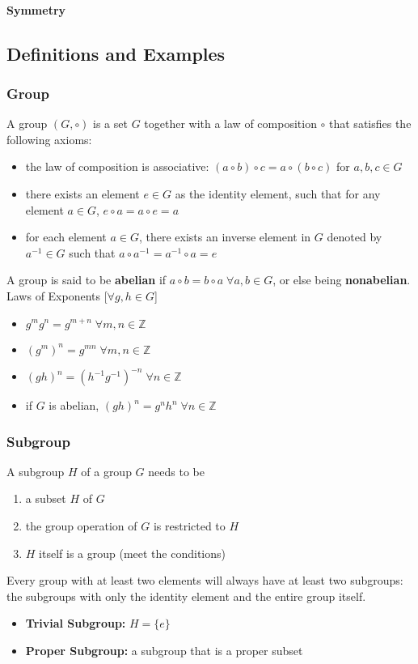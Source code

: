 \documentclass{article}
\begin{document}
\paragraph{Symmetry}
\subsection{Definitions and Examples}
\subsubsection{Group}
A group $(G,\circ)$ is a set $G$ together with a law of composition $\circ$ that satisfies the following axioms:
\begin{itemize}
    \item the law of composition is associative: 
    $(a\circ b)\circ c=a\circ (b\circ c)$ for $a,b,c\in G$
    \item there exists an element $e\in G$ as the identity element, such that for any element $a\in G$, $e\circ a=a\circ e=a$
    \item for each element $a\in G$, there exists an inverse element in $G$ denoted by $a^{-1}\in G$ such that $a\circ a^{-1}=a^{-1}\circ a=e$
\end{itemize}
A group is said to be \textbf{abelian} if $a\circ b=b\circ a \;\forall a,b\in G$, or else being \textbf{nonabelian}.
\\Laws of Exponents [$\forall g,h\in G$]\\
\begin{itemize}
    \item $g^{m}g^{n}=g^{m+n}\;\forall m,n\in \mathbb{Z}$
    \item $(g^m)^n=g^{mn}\;\forall m,n\in \mathbb{Z}$
    \item $(gh)^n=(h^{-1}g^{-1})^{-n}\;\forall n\in \mathbb{Z}$
    \item if $G$ is abelian, $(gh)^n=g^{n}h^{n}\;\forall n\in\mathbb{Z}$
\end{itemize}
\subsubsection{Subgroup}
A subgroup $H$ of a group $G$ needs to be
\begin{enumerate}
    \item a subset $H$ of $G$
    \item the group operation of $G$ is restricted to $H$
    \item $H$ itself is a group (meet the conditions)
\end{enumerate}
Every group with at least two elements will always have at least two subgroups: the subgroups with only the identity element and the entire group itself.
\begin{itemize}
    \item \textbf{Trivial Subgroup:} $H=\{e\}$
    \item \textbf{Proper Subgroup:} a subgroup that is a proper subset
\end{itemize}
\end{document}
